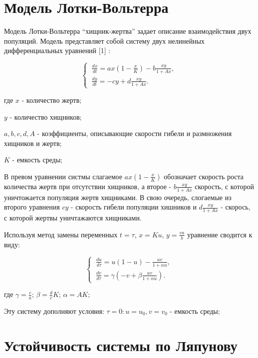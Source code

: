 \documentclass[
  13pt,
  fontsize=13pt,
  russian,
  a4paper,
,captions=tableheading
]{scrreprt}
\begin{document}
\hypertarget{ux43cux43eux434ux435ux43bux44c-ux43bux43eux442ux43aux438-ux432ux43eux43bux44cux442ux435ux440ux440ux430}{%
\section{Модель
Лотки-Вольтерра}\label{ux43cux43eux434ux435ux43bux44c-ux43bux43eux442ux43aux438-ux432ux43eux43bux44cux442ux435ux440ux440ux430}}

Модель Лотки-Вольтерра ``хищник-жертва'' задает описание взаимодействия
двух популяций. Модель представляет собой систему двух нелинейных
дифференциальных уравнений {[}1{]} :

\[
\begin{cases}
\ \frac{dx}{dt}=ax(1- \frac{x}{K})-b\frac{xy}{1+Ax},\\
\ \frac{dy}{dt}=-cy+d\frac{xy}{1+Ax}.
\end{cases}
\]

где \(x\) - количество жертв;

\(y\) - количество хищников;

\(a,b,c,d, A\) - коэффициенты, описывающие скорости гибели и размножения
хищников и жертв;

\(K\) - емкость среды;

В превом уравнении систмы слагаемое \(ax(1- \frac{x}{K})\) обозначает
скорость роста количества жертв при отсутствии хищников, а второе -
\(b\frac{xy}{1+Ax}\) скорость, с которой уничтожается популяция жертв
хищниками. В свою очередь, слогаемые из второго уравнения \(cy\) -
скорость гибели популяции хишников и \(d\frac{xy}{1+Ax}\) - скорось, с
которой жертвы уничтажаются хищниками.

Используя метод замены переменных \(t = \tau\), \(x = Ku\),
\(y = \frac{va}{b}\) уравнение сводится к виду:

\[
\begin{cases}
\ \frac{du}{d\tau}=u(1-u)-\frac{uv}{1+\alpha u},\\
\ \frac{dv}{d\tau}=\gamma(-v+\beta \frac{uv}{1+\alpha u}).
\end{cases}
\]

где \(\gamma=\frac{c}{a}\); \(\beta=\frac{d}{c}K\); \(\alpha = AK\);

Эту систему дополняют условия: \(\tau=0: u=u_0, v = v_0\) - емкость
среды;

\hypertarget{ux443ux441ux442ux43eux439ux447ux438ux432ux43eux441ux442ux44c-ux441ux438ux441ux442ux435ux43cux44b-ux43fux43e-ux43bux44fux43fux443ux43dux43eux432ux443}{%
\section{Устойчивость системы по
Ляпунову}\label{ux443ux441ux442ux43eux439ux447ux438ux432ux43eux441ux442ux44c-ux441ux438ux441ux442ux435ux43cux44b-ux43fux43e-ux43bux44fux43fux443ux43dux43eux432ux443}}
\end{document}
